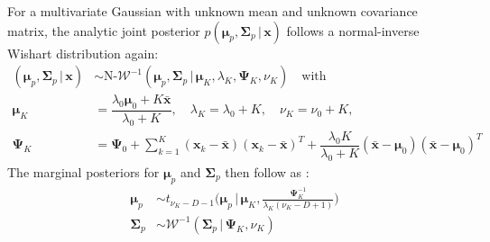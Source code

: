 \documentclass[twoside,11pt]{article}
\newcommand{\x}{\boldsymbol{x}}
\newcommand{\mub}{\boldsymbol{\mu}}
\newcommand{\Sigmab}{\boldsymbol{\Sigma}}
\newcommand{\Psib}{\boldsymbol{\Psi}}
\newcommand{\0}{\boldsymbol{0}}
\newcommand{\given}{\,|\,}
\renewcommand{\cite}[1]{\citep{#1}}
\begin{document}
For a multivariate Gaussian with unknown mean and unknown covariance matrix, the analytic joint posterior $p(\mub_p, \Sigmab_p\given\x)$ follows a normal-inverse Wishart distribution again:
\begin{equation}
\begin{aligned}
    (\mub_p, \Sigmab_p \given \x) & \sim\text{N-}\mathcal{W}^{-1}(\mub_p, \Sigmab_p\given\mub_K, \lambda_K, \Psib_K, \nu_K)\quad\text{with}\\
    \mub_K & = \dfrac{\lambda_0\mub_0 + K\bar{\x}}{\lambda_0+K},\quad 
    \lambda_K =\lambda_0+K,\quad
    \nu_K  = \nu_0+K,\\
    \Psib_K & = \Psib_0+\sum\limits_{k=1}^K(\x_k-\bar{\x})(\x_k-\bar{\x})^T+\dfrac{\lambda_0 K}{\lambda_0 + K}(\bar{\x}-\mub_0)(\bar{\x}-\mub_0)^T
\end{aligned}
\end{equation}
The marginal posteriors for $\mub_p$ and $\Sigmab_p$ then follow as \cite{Murphy2007}:
\begin{equation}\label{eq:mvn-full-cov:analytic-posterior:marginal}
\begin{aligned}
    \mub_p & \sim t_{\nu_K-D-1}\Big(\mub_p\,\Big|\,\mub_K, \frac{\Psib_K^{-1}}{\lambda_K(\nu_K-D+1)}\Big)\\
    \Sigmab_p & \sim \mathcal{W}^{-1}(\Sigmab_p\given\Psib_K, \nu_K)
\end{aligned}
\end{equation}
\end{document}
